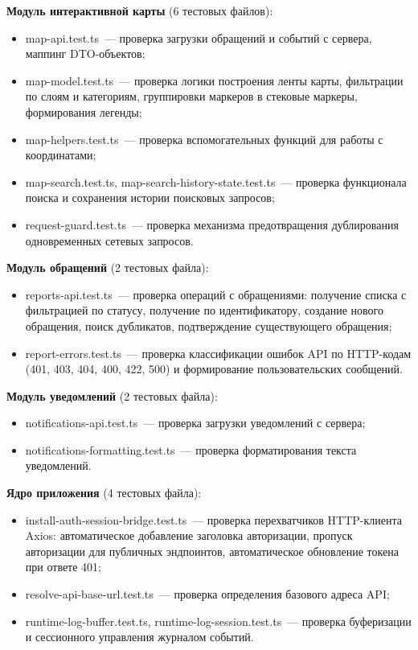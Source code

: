 \textbf{Модуль интерактивной карты} (6 тестовых файлов):
\begin{itemize}
    \item map-api.test.ts~--- проверка загрузки обращений и событий с сервера, маппинг DTO-объектов;
    \item map-model.test.ts~--- проверка логики построения ленты карты, фильтрации по слоям и категориям, группировки маркеров в стековые маркеры, формирования легенды;
    \item map-helpers.test.ts~--- проверка вспомогательных функций для работы с координатами;
    \item map-search.test.ts, map-search-history-state.test.ts~--- проверка функционала поиска и сохранения истории поисковых запросов;
    \item request-guard.test.ts~--- проверка механизма предотвращения дублирования одновременных сетевых запросов.
\end{itemize}

\textbf{Модуль обращений} (2 тестовых файла):
\begin{itemize}
    \item reports-api.test.ts~--- проверка операций с обращениями: получение списка с фильтрацией по статусу, получение по идентификатору, создание нового обращения, поиск дубликатов, подтверждение существующего обращения;
    \item report-errors.test.ts~--- проверка классификации ошибок API по HTTP-кодам (401, 403, 404, 400, 422, 500) и формирование пользовательских сообщений.
\end{itemize}

\textbf{Модуль уведомлений} (2 тестовых файла):
\begin{itemize}
    \item notifications-api.test.ts~--- проверка загрузки уведомлений с сервера;
    \item notifications-formatting.test.ts~--- проверка форматирования текста уведомлений.
\end{itemize}

\textbf{Ядро приложения} (4 тестовых файла):
\begin{itemize}
    \item install-auth-session-bridge.test.ts~--- проверка перехватчиков HTTP-клиента Axios: автоматическое добавление заголовка авторизации, пропуск авторизации для публичных эндпоинтов, автоматическое обновление токена при ответе 401;
    \item resolve-api-base-url.test.ts~--- проверка определения базового адреса API;
    \item runtime-log-buffer.test.ts, runtime-log-session.test.ts~--- проверка буферизации и сессионного управления журналом событий.
\end{itemize}

